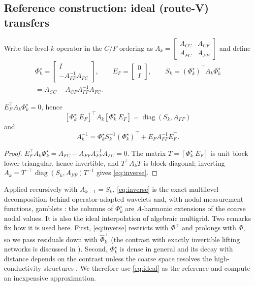 \subsection{Reference construction: ideal (route-V) transfers}\label{sec:routev}
Write the level-$k$ operator in the $C/F$ ordering as
$A_k = \begin{bmatrix} A_{CC} & A_{CF}\\ A_{FC} & A_{FF}\end{bmatrix}$ and define
\begin{multline}\label{eq:ideal}
  \Phi_k^\star = \begin{bmatrix} I\\ -A_{FF}^{-1}A_{FC}\end{bmatrix}, \qquad
  E_F = \begin{bmatrix} 0\\ I\end{bmatrix}, \qquad S_k = (\Phi_k^\star)^{\!\top} A_k \Phi_k^\star\\
  = A_{CC}-A_{CF}A_{FF}^{-1}A_{FC}.
\end{multline}
\begin{lemma}\label{lem:routev}
$E_F^\top A_k \Phi_k^\star = 0$, hence
\[
[\Phi_k^\star\;E_F]^\top A_k [\Phi_k^\star\;E_F] = \operatorname{diag}(S_k, A_{FF})
\]
and
\begin{equation}\label{eq:inverse}
  A_k^{-1} = \Phi_k^\star S_k^{-1} (\Phi_k^\star)^{\!\top} + E_F A_{FF}^{-1} E_F^\top .
\end{equation}
\end{lemma}
\begin{proof}
$E_F^\top A_k\Phi_k^\star = A_{FC} - A_{FF}A_{FF}^{-1}A_{FC} = 0$. The matrix $T = [\Phi_k^\star\;E_F]$ is unit block
lower triangular, hence invertible, and $T^\top A_k T$ is block diagonal; inverting
$A_k = T^{-\top}\operatorname{diag}(S_k,A_{FF})T^{-1}$ gives \eqref{eq:inverse}.
\end{proof}
Applied recursively with $A_{k-1} = S_k$, \eqref{eq:inverse} is the exact multilevel decomposition behind
operator-adapted wavelets \cite{amaratunga2006,sudarshan2005thesis,dheedene2005thesis} and, with nodal measurement functions, gamblets
\cite{owhadi2017}: the columns of $\Phi_k^\star$ are $A$-harmonic extensions of the coarse nodal values. It is also the
ideal interpolation of algebraic multigrid. Two remarks fix how it is used here. First, \eqref{eq:inverse} restricts with $\Phi^\top$ and prolongs with $\Phi$, so we
pass residuals down with $\widehat\Phi_k^{\!\top}$ (the contrast with exactly invertible lifting networks is discussed in
). Second, $\Phi_k^\star$ is dense in general and its decay with distance depends on the contrast
unless the coarse space resolves the high-conductivity structures \cite{hellman2017,peterseim2016}. We therefore use
\eqref{eq:ideal} as the reference and compute an inexpensive approximation.

